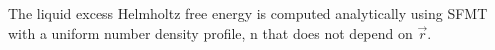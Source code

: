 \documentclass[double,12pt]{beavtex}
\begin{document}
%
The liquid excess Helmholtz free energy is computed analytically  
using SFMT with a uniform number density profile, n that does not depend 
on $\vec r$. 
\end{document}
